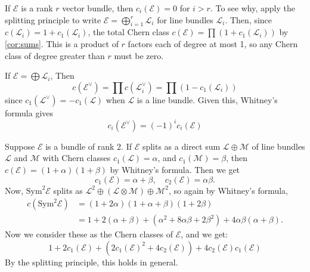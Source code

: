 \begin{example}[Vanishing]
    If $\mathcal{E}$ is a rank $r$ vector bundle, then $c_i(\mathcal{E}) = 0$ for $i > r$. To see why, apply the splitting principle to write $\mathcal{E} = \bigoplus_{i=1}^r \mathcal{L}_i$ for line bundles $\mathcal{L}_i$. Then, since $c(\mathcal{L}_i) = 1 + c_1(\mathcal{L}_i)$, the total Chern class $c(\mathcal{E}) = \prod (1 + c_1(\mathcal{L}_i))$ by \cref{cor:sums}. This is a product of $r$ factors each of degree at most 1, so any Chern class of degree greater than $r$ must be zero. 
\end{example}

\begin{example}[Duals]
    If $\mathcal{E} = \bigoplus \mathcal{L}_i$, Then
    \[c(\mathcal{E}^\vee) = \prod c(\mathcal{L}_i^\vee) = \prod (1 - c_1(\mathcal{L}_i))\]
    since $c_1(\mathcal{L}^\vee) = -c_1(\mathcal{L})$ when $\mathcal{L}$ is a line bundle. Given this, Whitney's formula gives
    \[c_i(\mathcal{E}^\vee) = (-1)^i c_i(\mathcal{E})\]
\end{example}

\begin{example}
    Suppose $\mathcal{E}$ is a bundle of rank 2. If $\mathcal{E}$ splits as a direct sum $\mathcal{L} \oplus \mathcal{M}$ of line bundles $\mathcal{L}$ and $\mathcal{M}$ with Chern classes $c_1(\mathcal{L}) = \alpha$, and $c_1(\mathcal{M}) = \beta$, then $c(\mathcal{E}) = (1 + \alpha)(1 + \beta)$ by Whitney's formula. 
    Then we get 
    \[c_1(\mathcal{E}) = \alpha + \beta, \quad c_2(\mathcal{E}) = \alpha \beta.\]
    Now, $\mathrm{Sym}^2 \mathcal{E}$ splits as $\mathcal{L}^2 \oplus (\mathcal{L} \otimes \mathcal{M}) \oplus \mathcal{M}^2$, so again by Whitney's formula,
    \begin{align*}
        c(\mathrm{Sym}^2 \mathcal{E}) &= (1 + 2\alpha)(1 + \alpha + \beta)(1 + 2\beta) \\
        &= 1 + 2(\alpha + \beta) + (\alpha^2 + 8\alpha \beta + 2\beta^2) + 4\alpha \beta(\alpha + \beta).
    \end{align*}
    Now we consider these as the Chern classes of $\mathcal{E}$, and we get:
    \[1 + 2c_1(\mathcal{E}) + (2c_1(\mathcal{E})^2 + 4c_2(\mathcal{E})) + 4c_2(\mathcal{E})c_1(\mathcal{E})\]
    By the splitting principle, this holds in general. 
\end{example}

